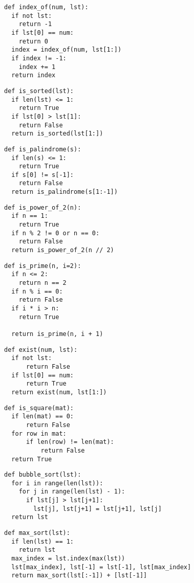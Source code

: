 \documentclass[11pt]{article}
\begin{document}
\begin{multicols}{2}
\begin{lstlisting}
def index_of(num, lst):
  if not lst:
    return -1
  if lst[0] == num:
    return 0
  index = index_of(num, lst[1:])
  if index != -1:
    index += 1
  return index
\end{lstlisting}

\begin{lstlisting}
def is_sorted(lst):
  if len(lst) <= 1:
    return True
  if lst[0] > lst[1]:
    return False
  return is_sorted(lst[1:])
\end{lstlisting}

\begin{lstlisting}
def is_palindrome(s):
  if len(s) <= 1:
    return True
  if s[0] != s[-1]:
    return False
  return is_palindrome(s[1:-1])
\end{lstlisting}

\begin{lstlisting}
def is_power_of_2(n):
  if n == 1:
    return True
  if n % 2 != 0 or n == 0:
    return False
  return is_power_of_2(n // 2)
\end{lstlisting}

\begin{lstlisting}
def is_prime(n, i=2):
  if n <= 2:
    return n == 2
  if n % i == 0:
    return False
  if i * i > n:
    return True
      
  return is_prime(n, i + 1)
\end{lstlisting}

\begin{lstlisting}
def exist(num, lst):
  if not lst:
      return False
  if lst[0] == num:
      return True
  return exist(num, lst[1:])
\end{lstlisting}

\begin{lstlisting}
def is_square(mat):
  if len(mat) == 0:
      return False
  for row in mat:
      if len(row) != len(mat):
          return False
  return True
\end{lstlisting}

\begin{lstlisting}
def bubble_sort(lst):
  for i in range(len(lst)):
    for j in range(len(lst) - 1):
      if lst[j] > lst[j+1]:
        lst[j], lst[j+1] = lst[j+1], lst[j]
  return lst
\end{lstlisting}
\end{multicols}
\vspace{-0.5cm}
\begin{lstlisting}
def max_sort(lst):
  if len(lst) == 1:
    return lst
  max_index = lst.index(max(lst))
  lst[max_index], lst[-1] = lst[-1], lst[max_index]
  return max_sort(lst[:-1]) + [lst[-1]]
\end{lstlisting}
\end{document}

